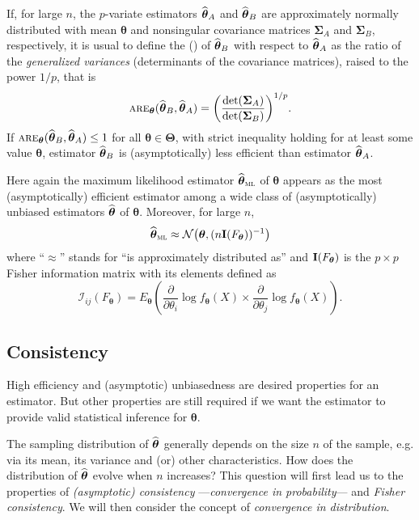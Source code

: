 If, for large $n$, the $p$-variate estimators $\widehat{\boldsymbol\theta}_A$ and
$\widehat{\boldsymbol\theta}_B$ are approximately normally distributed with mean
$\boldsymbol\theta$ and nonsingular covariance matrices $\boldsymbol\Sigma_A$ and
$\boldsymbol\Sigma_B$, respectively, it is usual to define the 
\emph{} () of
$\widehat{\boldsymbol\theta}_B$ with respect to $\widehat{\boldsymbol\theta}_A$ as
the ratio of the \emph{generalized variances} (determinants of the covariance
matrices), raised to the power $1/p$, that is
\[
    \stsc{ARE}_{\boldsymbol\theta}(\sthat{\boldsymbol\theta}_B, \sthat{\boldsymbol\theta}_A)
    = \left(\frac{ \det(\boldsymbol\Sigma_A)}{\det(\boldsymbol\Sigma_B)}\right)^{1/p}.
\]
If $\stsc{ARE}_{\boldsymbol\theta}(\sthat{\boldsymbol\theta}_B,
\sthat{\boldsymbol\theta}_A) \leq 1$ for all $\boldsymbol\theta \in
\boldsymbol\Theta$, with strict inequality holding for at least some value
$\boldsymbol\theta$, estimator $\widehat{\boldsymbol\theta}_B$ is
(asymptotically) less efficient than estimator $\widehat{\boldsymbol\theta}_A$.

Here again the maximum likelihood estimator $\sthat{\boldsymbol\theta}_\stsc{ML}$ of
$\boldsymbol\theta$ appears as the most (asymptotically) efficient estimator among a
wide class of (asymptotically) unbiased estimators $\widehat{\boldsymbol\theta}$ of
$\boldsymbol\theta$. Moreover, for large $n$,
\[
    \sthat{\boldsymbol\theta}_\stsc{ML} \approx 
    \mathcal{N}\left(\boldsymbol\theta, (n \stmat{I}(F_{\boldsymbol\theta}))^{-1}\right)
\]
where “$\approx$” stands for “is approximately distributed as” and
$\mathbf I(F_{\boldsymbol\theta})$ is the $p\times p$ Fisher information matrix
with its elements defined as
\[
    \mathcal{I}_{ij}\left(F_{\boldsymbol\theta}\right) =
    E_{\boldsymbol\theta}\left(
    \frac{\partial}{\partial\theta_i}\log f_{\boldsymbol\theta}(X) \times 
    \frac{\partial}{\partial \theta_j}\log f_{\boldsymbol\theta}(X)
    \right).
\] 


\subsection{Consistency}
\Index[consistency]{}

High efficiency and (asymptotic) unbiasedness are desired properties for an
estimator. But other properties are still required if we want the estimator to
provide valid statistical inference for $\boldsymbol\theta$.

The sampling distribution of $\widehat{\boldsymbol\theta}$ generally depends on
the size $n$ of the sample, e.g. via its mean, its variance and (or) other
characteristics. How does the distribution of $\widehat{\boldsymbol\theta}$
evolve when $n$ increases? This question will first lead us to the properties
of \emph{(asymptotic) consistency} ---\emph{convergence in probability}--- and
\emph{Fisher consistency}. We will then consider the concept of
\emph{convergence in distribution}.

